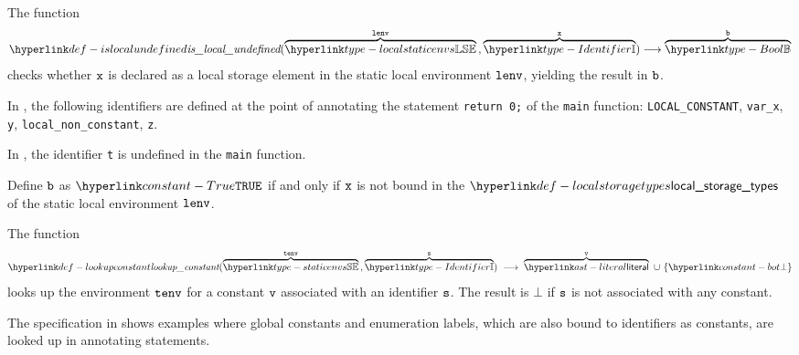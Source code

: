 \hypertarget{def-islocalundefined}{}
The function
\[
\islocalundefined(\overname{\localstaticenvs}{\lenv} \aslsep \overname{\Identifier}{\vx}) \aslto \overname{\Bool}{\vb}
\]
checks whether $\vx$ is declared as a local storage element in the static local environment $\lenv$, yielding the result in $\vb$.

In ,
the following identifiers are defined at the point of annotating the statement \verb|return 0;|
of the \verb|main| function:
\verb|LOCAL_CONSTANT|,
\verb|var_x|,
\verb|y|,
\verb|local_non_constant|,
\verb|z|.

In , the identifier \verb|t| is undefined in the \verb|main| function.

\ProseParagraph
Define $\vb$ as $\True$ if and only if $\vx$ is not bound in the $\localstoragetypes$ of the static local environment $\lenv$.
\FormallyParagraph
\begin{mathpar}
\end{mathpar}

\hypertarget{def-lookupconstant}{}
The function
\[
  \lookupconstant(\overname{\staticenvs}{\tenv} \aslsep \overname{\Identifier}{\vs})
  \;\aslto\; \overname{\literal}{\vv}\ \cup\ \{\bot\}
\]
looks up the environment $\tenv$ for a constant $\vv$ associated with an identifier
$\vs$. The result is $\bot$ if $\vs$ is not associated with any constant.

The specification in 
shows examples where global constants and enumeration labels,
which are also bound to identifiers as constants, are looked up
in annotating statements.

\ProseParagraph
{}

\FormallyParagraph
\begin{mathpar}
\end{mathpar}

